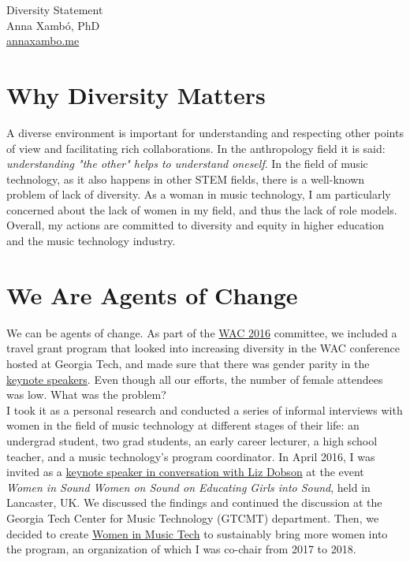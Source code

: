 \documentclass[10pt, a4paper]{article}
\begin{document}
{\LARGE Diversity Statement}\\[0.2cm]
Anna Xambó, PhD\\
\href{http://annaxambo.me}{annaxambo.me}

\section*{Why Diversity Matters}

A diverse environment is important for understanding and respecting other points of view and facilitating rich collaborations. In the anthropology field it is said: \emph{understanding "the other" helps to understand oneself}. In the field of music technology, as it also happens in other STEM fields, there is a well-known problem of lack of diversity. As a woman in music technology, I am particularly concerned about the lack of women in my field, and thus the lack of role models. Overall, my actions are committed to diversity and equity in higher education and the music technology industry.

\section*{We Are Agents of Change}

We can be agents of change. As part of the \href{http://webaudio.gatech.edu/}{WAC 2016} committee, we included a travel grant program that looked into increasing diversity in the WAC conference hosted at Georgia Tech, and made sure that there was gender parity in the \href{http://webaudio.gatech.edu/keynotes}{keynote speakers}. Even though all our efforts, the number of female attendees was low. What was the problem?\\

I took it as a personal research and conducted a series of informal interviews with women in the field of music technology at different stages of their life: an undergrad student, two grad students, an early career lecturer, a high school teacher, and a music technology's program coordinator. In April 2016, I was invited as a \href{http://wiswos.bitbucket.org/index.html\%3Fp=435.html}{keynote speaker in conversation with Liz Dobson} at the event \emph{Women in Sound Women on Sound on Educating Girls into Sound}, held in Lancaster, UK. We discussed the findings and continued the discussion at the Georgia Tech Center for Music Technology (GTCMT) department. Then, we decided to create \href{http://www.gtcmt.gatech.edu/}{Women in Music Tech} to sustainably bring more women into the program, an organization of which I was co-chair from 2017 to 2018.
\end{document}
